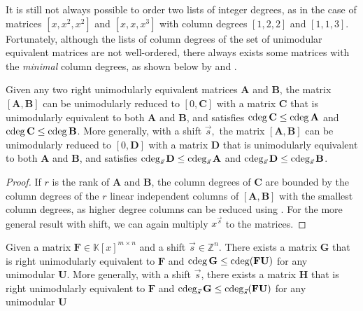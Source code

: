 It is still not always possible to order two lists of integer degrees,
as in the case of matrices $\left[x,x^{2},x^{2}\right]$ and $\left[x,x,x^{3}\right]$
with column degrees $\left[1,2,2\right]$ and $\left[1,1,3\right]$.
Fortunately, although the lists of column degrees of the set of unimodular
equivalent matrices are not well-ordered, there always exists some
matrices with the \emph{minimal} column degrees, as shown below by
 and .
\begin{lem}
\label{lem:matrixGCDlowerDegrees}Given any two right unimodularly
equivalent matrices $\mathbf{A}$ and $\mathbf{B}$, the matrix $\left[\mathbf{A},\mathbf{B}\right]$
can be unimodularly reduced to $\left[0,\mathbf{C}\right]$ with a
matrix $\mathbf{C}$ that is unimodularly equivalent to both $\mathbf{A}$
and $\mathbf{B}$, and satisfies $\cdeg\mathbf{C}\le\cdeg\mathbf{A}$
and $\cdeg\mathbf{C}\le\cdeg\mathbf{B}$. More generally, with a shift
$\vec{s},$ the matrix $\left[\mathbf{A},\mathbf{B}\right]$ can be
unimodularly reduced to $\left[0,\mathbf{D}\right]$ with a matrix
$\mathbf{D}$ that is unimodularly equivalent to both $\mathbf{A}$
and $\mathbf{B}$, and satisfies $\cdeg_{\vec{s}}\mathbf{D}\le\cdeg_{\vec{s}}\mathbf{A}$
and $\cdeg_{\vec{s}}\mathbf{D}\le\cdeg_{\vec{s}}\mathbf{B}$. \end{lem}
\begin{proof}
If $r$ is the rank of $\mathbf{A}$ and $\mathbf{B}$, the column
degrees of $\mathbf{C}$ are bounded by the column degrees of the
$r$ linear independent columns of $\left[\mathbf{A},\mathbf{B}\right]$
with the smallest column degrees, as higher degree columns can be
reduced using . For
the more general result with shift, we can again multiply $x^{\vec{s}}$
to the matrices.\end{proof}
\begin{cor}
\label{cor:minimalUnimodularEquivalentMatrix}Given a matrix $\mathbf{F}\in\mathbb{K}\left[x\right]^{m\times n}$
and a shift $\vec{s}\in\mathbb{Z}^{n}$. There exists a matrix $\mathbf{G}$
that is right unimodularly equivalent to $\mathbf{F}$ and $\cdeg\mathbf{G}\le\cdeg(\mathbf{F}\mathbf{U})$
for any unimodular $\mathbf{U}$. More generally, with a shift $\vec{s}$,
there exists a matrix $\mathbf{H}$ that is right unimodularly equivalent
to $\mathbf{F}$ and $\cdeg_{\vec{s}}\mathbf{G}\le\cdeg_{\vec{s}}(\mathbf{F}\mathbf{U})$
for any unimodular $\mathbf{U}$\end{cor}
